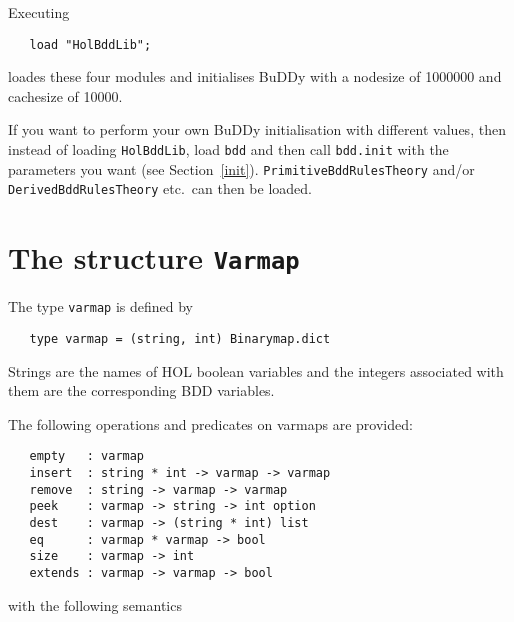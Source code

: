 \documentclass[12pt]{article}
\renewcommand{\t}[1]{\mbox{\tt #1}}
\newcommand{\ml}[1]{{\tt #1}}
\newcommand{\Buddy}{BuDDy\xspace}
\begin{document}
Executing

\vspace*{-2mm}

\begin{verbatim}
   load "HolBddLib";
\end{verbatim}

\vspace*{-2mm}

loades these four modules and
initialises \Buddy{} with a nodesize of 1000000
and cachesize of 10000.  

If you want to perform your own \Buddy{} initialisation with different
values, then instead of loading \t{HolBddLib}, load \t{bdd} and then
call \t{bdd.init} with the parameters you want (see
Section~\ref{init}).  \t{PrimitiveBddRulesTheory} and/or
\t{DerivedBddRulesTheory} etc.~can  then be loaded.

\section{The structure \ml{Varmap}}\label{Varmap}

The type \t{varmap} is defined by

\vspace*{-2mm}

\begin{verbatim}
   type varmap = (string, int) Binarymap.dict
\end{verbatim}

\vspace*{-2mm}

Strings are the names of HOL boolean variables and the integers associated with them
are the corresponding BDD variables.

\newpage

The following operations and predicates on varmaps are provided:

\begin{verbatim}
   empty   : varmap
   insert  : string * int -> varmap -> varmap
   remove  : string -> varmap -> varmap
   peek    : varmap -> string -> int option
   dest    : varmap -> (string * int) list
   eq      : varmap * varmap -> bool
   size    : varmap -> int
   extends : varmap -> varmap -> bool
\end{verbatim}

with the following semantics

\bigskip
\end{document}
